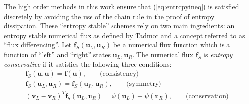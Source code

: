 \documentclass[review]{siamart0216}
\theoremstyle{assumption}
\newcommand{\LRp}[1]{\left( #1 \right)}
\begin{document}
The high order methods in this work ensure that (\ref{eq:entropyineq}) is satisfied discretely by avoiding the use of the chain rule in the proof of entropy dissipation.  These ``entropy stable'' schemes rely on two main ingredients: an entropy stable numerical flux as defined by Tadmor \cite{tadmor1987numerical} and a concept referred to as ``flux differencing''.  %
Let $\bm{f}_S\LRp{\bm{u}_L,\bm{u}_R}$ be a numerical flux function which is a function of ``left'' and ``right'' states $\bm{u}_L,\bm{u}_R$.  
The numerical flux $\bm{f}_S$ is \textit{entropy conservative} if it satisfies the following three conditions:  
\begin{gather}
\bm{f}_S(\bm{u},\bm{u}) = \bm{f}(\bm{u}), \qquad \text{(consistency)}\\
\bm{f}_S(\bm{u}_L,\bm{u}_R) = \bm{f}_S(\bm{u}_R,\bm{u}_R), \qquad \text{(symmetry)}\nonumber\\
\LRp{\bm{v}_L-\bm{v}_R}^T\bm{f}_S(\bm{u}_L,\bm{u}_R) = \psi(\bm{u}_L) - \psi(\bm{u}_R), \qquad \text{(conservation)}\nonumber
\label{eq:esflux}
\end{gather}
\end{document}
